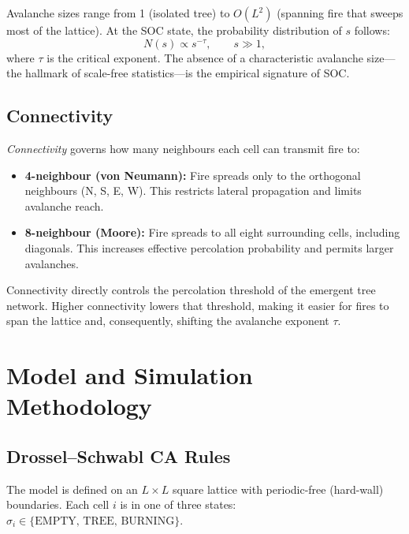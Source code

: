 \documentclass[12pt,a4paper]{article}
\begin{document}
Avalanche sizes range from 1 (isolated tree) to $O(L^2)$ (spanning fire
that sweeps most of the lattice).  At the SOC state, the probability
distribution of $s$ follows:
\begin{equation}
  N(s) \propto s^{-\tau}, \qquad s \gg 1,
  \label{eq:powerlaw}
\end{equation}
where $\tau$ is the critical exponent.  The absence of a characteristic
avalanche size---the hallmark of scale-free statistics---is the empirical
signature of SOC.

\subsection{Connectivity}

\emph{Connectivity} governs how many neighbours each cell can transmit
fire to:

\begin{itemize}
  \item \textbf{4-neighbour (von Neumann):}  Fire spreads only to the
        orthogonal neighbours (N, S, E, W).  This restricts lateral
        propagation and limits avalanche reach.

  \item \textbf{8-neighbour (Moore):}  Fire spreads to all eight
        surrounding cells, including diagonals.  This increases
        effective percolation probability and permits larger avalanches.
\end{itemize}

Connectivity directly controls the percolation threshold of the
emergent tree network.  Higher connectivity lowers that threshold,
making it easier for fires to span the lattice and, consequently,
shifting the avalanche exponent $\tau$.

\section{Model and Simulation Methodology}
\label{sec:methods}

\subsection{Drossel--Schwabl CA Rules}

The model is defined on an $L\times L$ square lattice with periodic-free
(hard-wall) boundaries.  Each cell $i$ is in one of three states:
$\sigma_i \in \{\text{EMPTY},\, \text{TREE},\, \text{BURNING}\}$.
\end{document}
